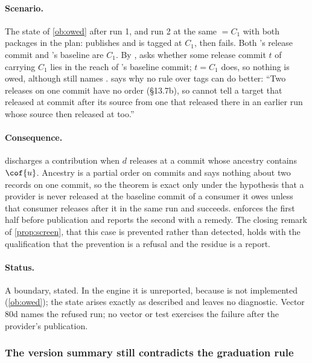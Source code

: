 \paragraph{Scenario.} The state of \cref{ob:owed} after run 1, and run 2 at
the same \Head{} $= C_1$ with both packages in the plan: 
publishes and is tagged at $C_1$, then  fails. Both
's release commit and 's baseline are $C_1$. By
,  asks whether some release
commit $t$ of  carrying $C_1$ lies in the reach of 's
baseline commit; $t = C_1$ does, so nothing is owed, although 
still names .  says why no rule over tags can do
better: ``Two releases on one commit have no order (\S13.7b), so
 cannot tell a target that released at commit  after
its source from one that released there in an earlier run whose source then
released at  too.''

\paragraph{Consequence.}  discharges a contribution when $d$
releases at a commit whose ancestry contains $\cof{u}$. Ancestry is a partial
order on commits and says nothing about two records on one commit, so the
theorem is exact only under the hypothesis that a provider is never released
at the baseline commit of a consumer it owes unless that consumer releases
after it in the same run and succeeds.  enforces the first half
before publication and reports the second with a remedy. The closing remark
of \cref{prop:screen}, that this case is prevented rather than detected,
holds with the qualification that the prevention is a refusal and the
residue is a report.

\paragraph{Status.} A boundary, stated. In the engine it is unreported,
because  is not implemented (\cref{ob:owed}); the state arises
exactly as described and leaves no diagnostic. Vector 80d names the refused
run; no vector or test exercises the failure after the provider's
publication.

\subsubsection{The version summary still contradicts the graduation rule}

